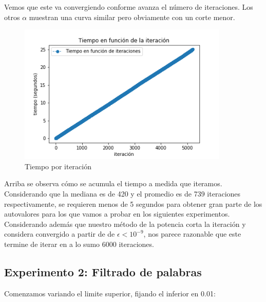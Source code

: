 Vemos que este va convergiendo conforme avanza el número de iteraciones. Los otros $\alpha$ muestran una curva similar pero obviamente con un corte menor. \\

\begin{figure}[H]
     \begin{center}
     \includegraphics[width=100mm]{img/tiempo_x_iter.png} 
    \end{center}
\caption{Tiempo por iteración} \label{fig:exp1-tiempo}
\end{figure}

Arriba se observa cómo se acumula el tiempo a medida que iteramos. Considerando que la mediana es de 420 y el promedio es de 739 iteraciones respectivamente, se requieren menos de 5 segundos para obtener gran parte de los autovalores para los que vamos a probar en los siguientes experimentos. \\

Considerando además que nuestro método de la potencia corta la iteración y considera convergido a partir de de $\epsilon < 10^{-9}$, nos parece razonable que este termine de iterar en a lo sumo 6000 iteraciones. 

\newpage

\subsection{Experimento 2: Filtrado de palabras}

Comenzamos variando el limite superior, fijando el inferior en 0.01:

